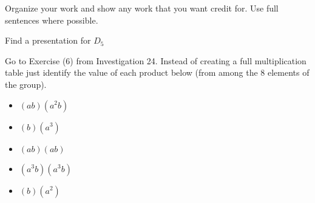 \documentclass[addpoints]{exam}
\begin{document}
Organize your work and show any work that you want credit for. Use full sentences where possible.

\begin{questions}
\question 
Find a presentation for $D_5$ 

\question
Go to Exercise (6) from Investigation 24. Instead of creating a full multiplication table just identify the value of each product below (from among the 8 elements of the group).
\begin{itemize}
\item $(ab)(a^2b)$
\item $(b)(a^3)$
\item $(ab)(ab)$
\item $(a^3b)(a^3b)$
\item $(b)(a^2)$
\end{itemize}







\end{questions}
\end{document}
